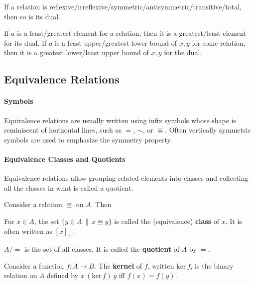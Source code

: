 \begin{theorem}
If a relation is reflexive/irreflexive/symmetric/antisymmetric/transitive/total, then so is its dual.

If $a$ is a least/greatest element for a relation, then it is a greatest/least element for its dual.
If $a$ is a least upper/greatest lower bound of $x,y$ for some relation, then it is a greatest lower/least upper bound of $x,y$ for the dual.
\end{theorem}

\subsection{Equivalence Relations}

\paragraph{Symbols}
Equivalence relations are usually written using infix symbols whose shape is reminiscent of horizontal lines, such as $=$, $\sim$, or $\Equiv$.
Often vertically symmetric symbols are used to emphasize the symmetry property.

\paragraph{Equivalence Classes and Quotients}
Equivalence relations allow grouping related elements into classes and collecting all the classes in what is called a quotient.

\begin{definition}[Quotient]
Consider a relation $\Equiv$ on $A$.
Then
\begin{compactitem}
 \item For $x\in A$, the set $\{y\in A\,\|\,x\Equiv y\}$ is called the (equivalence) \textbf{class} of $x$.
  It is often written as $[x]_\Equiv$.
 \item $A/\Equiv$ is the set of all classes.
  It is called the \textbf{quotient} of $A$ by $\Equiv$.
\end{compactitem}
\end{definition}

\begin{definition}[Kernel]\label{def:kernel}
Consider a function $f:A\to B$. The \textbf{kernel} of $f$, written $\mathrm{ker}\, f$, is the binary relation on $A$ defined by $x\,(\mathrm{ker}\, f)\,y$ iff $f(x)=f(y)$.
\end{definition}

